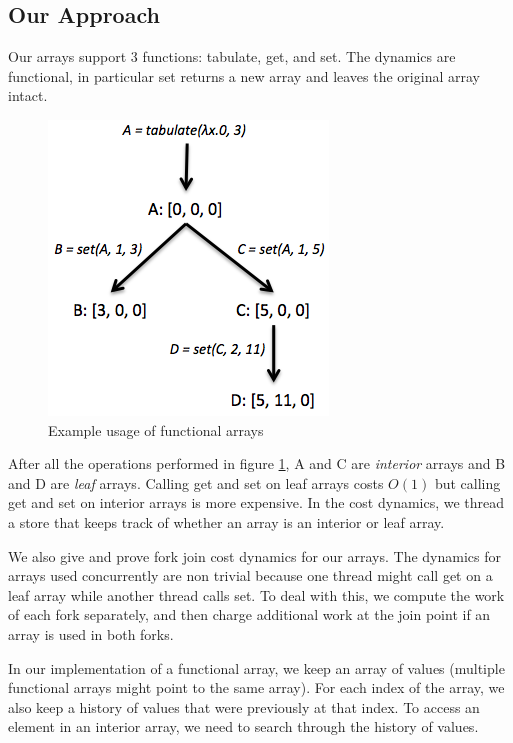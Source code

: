 \documentclass[preprint]{sigplanconf}
\begin{document}
\subsection{Our Approach}

Our arrays support 3 functions: tabulate, get, and set. The dynamics are functional, in particular set returns a new array and leaves the original array intact.

\begin{figure}[!ht]
\centering
\includegraphics[scale=0.45]{leaf_interior_intro}
\nocaptionrule \caption{Example usage of functional arrays}
\label{fig:leaf_interior_intro}
\end{figure}

After all the operations performed in figure \ref{fig:leaf_interior_intro}, A and C are \emph{interior} arrays and B and D are \emph{leaf} arrays. Calling get and set on leaf arrays costs $O(1)$ but calling get and set on interior arrays is more expensive. In the cost dynamics, we thread a store that keeps track of whether an array is an interior or leaf array.

We also give and prove fork join cost dynamics for our arrays. The dynamics for arrays used concurrently are non trivial because one thread might call get on a leaf array while another thread calls set. To deal with this, we compute the work of each fork separately, and then charge additional work at the join point if an array is used in both forks.

In our implementation of a functional array, we keep an array of values (multiple functional arrays might point to the same array). For each index of the array, we also keep a history of values that were previously at that index. To access an element in an interior array, we need to search through the history of values.
\end{document}
